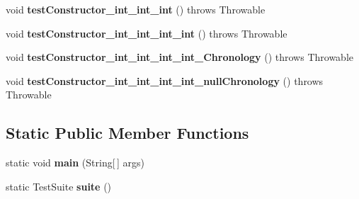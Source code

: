 \begin{DoxyCompactItemize}
\item 
\hypertarget{classorg_1_1joda_1_1time_1_1_test_local_time___constructors_a703bd4ccfd993b9126b4ad6c6e29b209}{void {\bfseries test\-Constructor\-\_\-int\-\_\-int\-\_\-int} ()  throws Throwable }\label{classorg_1_1joda_1_1time_1_1_test_local_time___constructors_a703bd4ccfd993b9126b4ad6c6e29b209}

\item 
\hypertarget{classorg_1_1joda_1_1time_1_1_test_local_time___constructors_a440aa7da3ebca5cc71ad8641707aaf19}{void {\bfseries test\-Constructor\-\_\-int\-\_\-int\-\_\-int\-\_\-int} ()  throws Throwable }\label{classorg_1_1joda_1_1time_1_1_test_local_time___constructors_a440aa7da3ebca5cc71ad8641707aaf19}

\item 
\hypertarget{classorg_1_1joda_1_1time_1_1_test_local_time___constructors_ac163560f155f6b56f0afb2fd53ea3c71}{void {\bfseries test\-Constructor\-\_\-int\-\_\-int\-\_\-int\-\_\-int\-\_\-\-Chronology} ()  throws Throwable }\label{classorg_1_1joda_1_1time_1_1_test_local_time___constructors_ac163560f155f6b56f0afb2fd53ea3c71}

\item 
\hypertarget{classorg_1_1joda_1_1time_1_1_test_local_time___constructors_a8c8034991f531d104f3434fad901f888}{void {\bfseries test\-Constructor\-\_\-int\-\_\-int\-\_\-int\-\_\-int\-\_\-null\-Chronology} ()  throws Throwable }\label{classorg_1_1joda_1_1time_1_1_test_local_time___constructors_a8c8034991f531d104f3434fad901f888}

\end{DoxyCompactItemize}
\subsection*{Static Public Member Functions}
\begin{DoxyCompactItemize}
\item 
\hypertarget{classorg_1_1joda_1_1time_1_1_test_local_time___constructors_ae96b8b83dd62c261388a550162393612}{static void {\bfseries main} (String\mbox{[}$\,$\mbox{]} args)}\label{classorg_1_1joda_1_1time_1_1_test_local_time___constructors_ae96b8b83dd62c261388a550162393612}

\item 
\hypertarget{classorg_1_1joda_1_1time_1_1_test_local_time___constructors_a80e21c565c4c4dab01d666af539c5b05}{static Test\-Suite {\bfseries suite} ()}\label{classorg_1_1joda_1_1time_1_1_test_local_time___constructors_a80e21c565c4c4dab01d666af539c5b05}

\end{DoxyCompactItemize}
